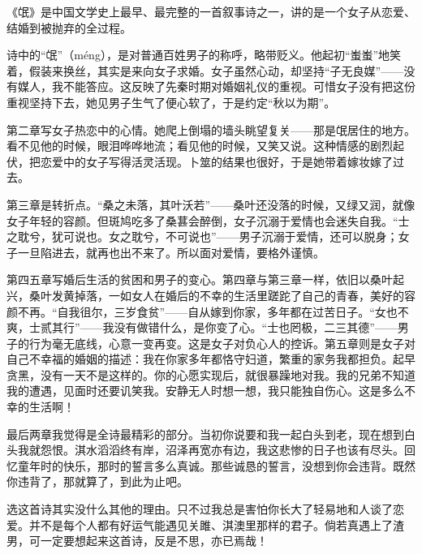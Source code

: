 \begin{appreciation}
《氓》是中国文学史上最早、最完整的一首叙事诗之一，讲的是一个女子从恋爱、结婚到被抛弃的全过程。

诗中的“氓”（méng），是对普通百姓男子的称呼，略带贬义。他起初“蚩蚩”地笑着，假装来换丝，其实是来向女子求婚。女子虽然心动，却坚持“子无良媒”——没有媒人，我不能答应。这反映了先秦时期对婚姻礼仪的重视。可惜女子没有把这份重视坚持下去，她见男子生气了便心软了，于是约定“秋以为期”。

第二章写女子热恋中的心情。她爬上倒塌的墙头眺望复关——那是氓居住的地方。看不见他的时候，眼泪哗哗地流；看见他的时候，又笑又说。这种情感的剧烈起伏，把恋爱中的女子写得活灵活现。卜筮的结果也很好，于是她带着嫁妆嫁了过去。

第三章是转折点。“桑之未落，其叶沃若”——桑叶还没落的时候，又绿又润，就像女子年轻的容颜。但斑鸠吃多了桑葚会醉倒，女子沉溺于爱情也会迷失自我。“士之耽兮，犹可说也。女之耽兮，不可说也”——男子沉溺于爱情，还可以脱身；女子一旦陷进去，就再也出不来了。所以面对爱情，要格外谨慎。

第四五章写婚后生活的贫困和男子的变心。第四章与第三章一样，依旧以桑叶起兴，桑叶发黄掉落，一如女人在婚后的不幸的生活里蹉跎了自己的青春，美好的容颜不再。“自我徂尔，三岁食贫”——自从嫁到你家，多年都在过苦日子。“女也不爽，士贰其行”——我没有做错什么，是你变了心。“士也罔极，二三其德”——男子的行为毫无底线，心意一变再变。这是女子对负心人的控诉。第五章则是女子对自己不幸福的婚姻的描述：我在你家多年都恪守妇道，繁重的家务我都担负。起早贪黑，没有一天不是这样的。你的心愿实现后，就很暴躁地对我。我的兄弟不知道我的遭遇，见面时还要讥笑我。安静无人时想一想，我只能独自伤心。这是多么不幸的生活啊！

最后两章我觉得是全诗最精彩的部分。当初你说要和我一起白头到老，现在想到白头我就怨恨。淇水滔滔终有岸，沼泽再宽亦有边，我这悲惨的日子也该有尽头。回忆童年时的快乐，那时的誓言多么真诚。那些诚恳的誓言，没想到你会违背。既然你违背了，那就算了，到此为止吧。

选这首诗其实没什么其他的理由。只不过我总是害怕你长大了轻易地和人谈了恋爱。并不是每个人都有好运气能遇见关雎、淇澳里那样的君子。倘若真遇上了渣男，可一定要想起来这首诗，反是不思，亦已焉哉！

\end{appreciation}
